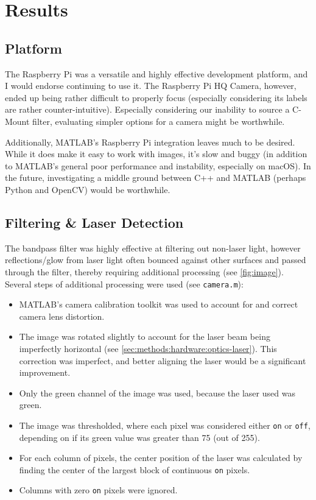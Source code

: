 \documentclass{article}
\newcommand{\code}{\texttt}
\begin{document}
\section{Results} \label{sec:results}

\subsection{Platform} \label{sec:results:platform}

The Raspberry Pi was a versatile and highly effective development platform, and I would endorse continuing to use it. The Raspberry Pi HQ Camera, however, ended up being rather difficult to properly focus (especially considering its labels are rather counter-intuitive). Especially considering our inability to source a C-Mount filter, evaluating simpler options for a camera might be worthwhile.

Additionally, MATLAB's Raspberry Pi integration leaves much to be desired. While it does make it easy to work with images, it's slow and buggy (in addition to MATLAB's general poor performance and instability, especially on macOS). In the future, investigating a middle ground between C++ and MATLAB (perhaps Python and OpenCV) would be worthwhile.

\subsection{Filtering \& Laser Detection} \label{sec:results:filtering-laser-detection}

The bandpass filter was highly effective at filtering out non-laser light, however reflections/glow from laser light often bounced against other surfaces and passed through the filter, thereby requiring additional processing (see \autoref{fig:image}). Several steps of additional processing were used (see \code{camera.m}):

\begin{itemize}
    \item MATLAB's camera calibration toolkit was used to account for and correct camera lens distortion.
    \item The image was rotated slightly to account for the laser beam being imperfectly horizontal (see \ref{sec:methods:hardware:optics-laser}). This correction was imperfect, and better aligning the laser would be a significant improvement.
    \item Only the green channel of the image was used, because the laser used was green.
    \item The image was thresholded, where each pixel was considered either \code{on} or \code{off}, depending on if its green value was greater than 75 (out of 255).
    \item For each column of pixels, the center position of the laser was calculated by finding the center of the largest block of continuous \code{on} pixels.
    \item Columns with zero \code{on} pixels were ignored.
\end{itemize}
\end{document}
